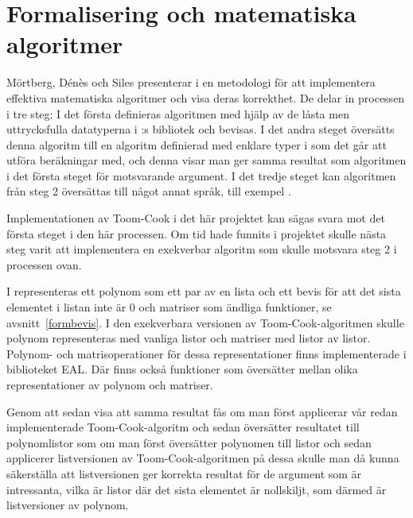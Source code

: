\section{Formalisering och matematiska algoritmer}
\label{sec:exekverbar}
Mörtberg, Dénès och Siles presenterar i \cite{denes2012refinement} en metodologi för att
implementera effektiva matematiska algoritmer och visa deras korrekthet.
De delar in processen i tre steg: I det första definieras algoritmen med hjälp av de
låsta men uttrycksfulla datatyperna i \ssr{}:s bibliotek och bevisas. I det andra
steget översätts denna algoritm till en algoritm definierad med enklare typer i \ssr{}
som det går att utföra beräkningar med, och denna visar man ger samma resultat som
algoritmen i det första steget för motsvarande argument. I det tredje steget kan
algoritmen från steg 2 översättas till något annat språk, till exempel \haskell{}.

Implementationen av Toom-Cook i det här projektet kan sägas svara mot det
första steget i den här processen. Om tid hade funnits i projektet skulle nästa
steg varit att implementera en exekverbar algoritm som skulle motsvara steg 2 i
processen ovan.

I \ssr{} representeras ett polynom som ett par av en lista och ett bevis för
att det sista elementet i listan inte är 0 och matriser som ändliga funktioner,
se avsnitt~\ref{formbevis}. I den exekverbara versionen av Toom-Cook-algoritmen
skulle polynom representeras med vanliga listor och matriser med listor av
listor. Polynom- och matrisoperationer för dessa representationer finns
implementerade i biblioteket \coq{}EAL\cite{coqeal}. Där finns också funktioner
som översätter mellan olika representationer av polynom och matriser.

Genom att sedan visa att samma resultat fås om man först applicerar vår redan
implementerade Toom-Cook-algoritm och sedan översätter resultatet till
polynomlistor som om man först översätter polynomen till listor och sedan
applicerer listversionen av Toom-Cook-algoritmen på dessa skulle man då kunna
säkerställa att listversionen ger korrekta resultat för de argument som är
intressanta, vilka är listor där det sista elementet är nollskiljt, som därmed
är listversioner av polynom.

